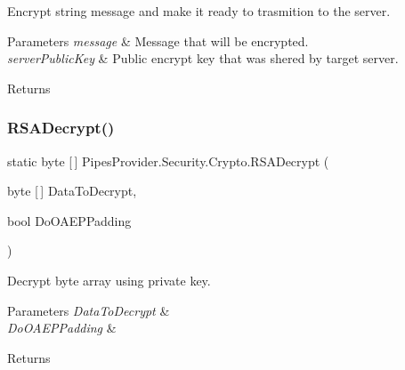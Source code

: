Encrypt string message and make it ready to trasmition to the server. 


\begin{DoxyParams}{Parameters}
{\em message} & Message that will be encrypted.\\
\hline
{\em server\+Public\+Key} & Public encrypt key that was shered by target server.\\
\hline
\end{DoxyParams}
\begin{DoxyReturn}{Returns}

\end{DoxyReturn}
\mbox{\label{class_pipes_provider_1_1_security_1_1_crypto_aeaf01f17d57b624fd4809ceb2836ebe0}} 
\subsubsection{\texorpdfstring{R\+S\+A\+Decrypt()}{RSADecrypt()}}
{\footnotesize\ttfamily static byte \mbox{[}$\,$\mbox{]} Pipes\+Provider.\+Security.\+Crypto.\+R\+S\+A\+Decrypt (\begin{DoxyParamCaption}\item[{byte \mbox{[}$\,$\mbox{]}}]{Data\+To\+Decrypt,  }\item[{bool}]{Do\+O\+A\+E\+P\+Padding }\end{DoxyParamCaption})\hspace{0.3cm}{\ttfamily [static]}}



Decrypt byte array using private key. 


\begin{DoxyParams}{Parameters}
{\em Data\+To\+Decrypt} & \\
\hline
{\em Do\+O\+A\+E\+P\+Padding} & \\
\hline
\end{DoxyParams}
\begin{DoxyReturn}{Returns}

\end{DoxyReturn}
\mbox{\label{class_pipes_provider_1_1_security_1_1_crypto_a09f2c39c0c97bf871f3ab9df2f1a40fd}} 
